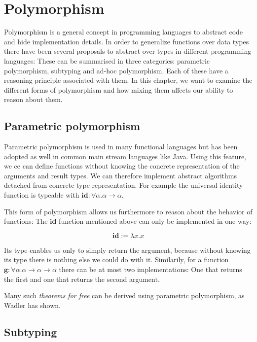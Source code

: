 \chapter{Polymorphism}\label{ch:polymorphism}

Polymorphism is a general concept in programming languages to abstract code and hide implementation details.
In order to generalize functions over data types there have been several proposals to abstract over types in different programming languages:
These can be summarised in three categories: parametric polymorphism, subtyping and ad-hoc polymorphism.
Each of these have a reasoning principle associated with them.
In this chapter, we want to examine the different forms of polymorphism and how mixing them affects our ability to reason about them.

\section{Parametric polymorphism}\label{sec:parmetric-polymorphism}

Parametric polymorphism is used in many functional languages but has been adopted as well in common main stream languages like Java.
Using this feature, we ce can define functions without knowing the concrete representation of the arguments and result types.
We can therefore implement abstract algorithms detached from concrete type representation.
For example the universal identity function is typeable with $\mathbf{id} : \forall \alpha. \alpha \to \alpha$.

This form of polymorphism allows us furthermore to reason about the behavior of functions:
The $\mathbf{id}$ function mentioned above can only be implemented in one way:

$$
\mathbf{id} := \lambda x.x
$$

Its type enables us only to simply return the argument, because without knowing its type there is nothing else we could do with it.
Similarily, for a function $\mathbf{g} : \forall \alpha. \alpha \to \alpha \to \alpha$ there can be at most two implementations:
One that returns the first and one that returns the second argument.

Many such \emph{theorems for free} can be derived using parametric polymorphism, as Wadler has shown. \cite{wadlertheorems}

\section{Subtyping}\label{sec:subtyping}

